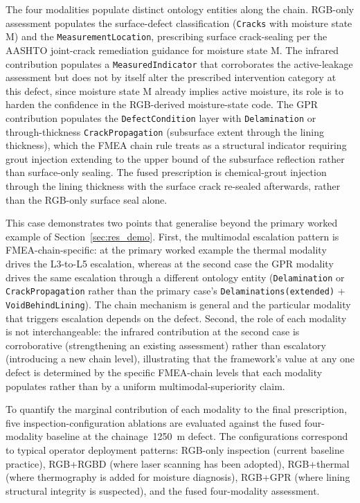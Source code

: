 \documentclass[11pt,a4paper]{article}
\begin{document}
The four modalities populate distinct ontology entities along the chain. RGB-only assessment populates the surface-defect classification (\texttt{Cracks} with moisture state M) and the \texttt{MeasurementLocation}, prescribing surface crack-sealing per the AASHTO joint-crack remediation guidance for moisture state M. The infrared contribution populates a \texttt{MeasuredIndicator} that corroborates the active-leakage assessment but does not by itself alter the prescribed intervention category at this defect, since moisture state M already implies active moisture, its role is to harden the confidence in the RGB-derived moisture-state code. The GPR contribution populates the \texttt{DefectCondition} layer with \texttt{Delamination} or through-thickness \texttt{CrackPropagation} (subsurface extent through the lining
thickness), which the FMEA chain rule treats as a structural indicator requiring grout injection extending to the upper bound of the subsurface reflection rather than surface-only sealing. The fused prescription is chemical-grout injection through the lining thickness with the surface crack re-sealed afterwards, rather than the RGB-only surface seal alone.

This case demonstrates two points that generalise beyond the primary worked example of Section~\ref{sec:res_demo}. First, the multimodal escalation pattern is FMEA-chain-specific: at the primary worked example the thermal modality drives the L3-to-L5 escalation, whereas at the second case the GPR modality drives the same escalation through a different ontology entity (\texttt{Delamination} or \texttt{CrackPropagation} rather than the primary case's \texttt{Delaminations(extended)} + \texttt{VoidBehindLining}). The chain mechanism is general and the
particular modality that triggers escalation depends on the defect. Second, the role of each modality is not interchangeable: the infrared contribution at the second case is corroborative (strengthening an existing assessment) rather than escalatory (introducing a new chain level), illustrating that the framework's value at any one defect is determined by the specific FMEA-chain levels that each modality populates rather than by a uniform multimodal-superiority claim.

To quantify the marginal contribution of each modality to the final prescription, five inspection-configuration ablations are evaluated against the fused four-modality baseline at the chainage~1250~m defect. The configurations correspond to typical operator deployment patterns: RGB-only inspection (current baseline practice), RGB+RGBD (where laser scanning has been adopted), RGB+thermal (where thermography is added for moisture diagnosis), RGB+GPR (where lining structural integrity is suspected), and the fused four-modality assessment.
\end{document}
